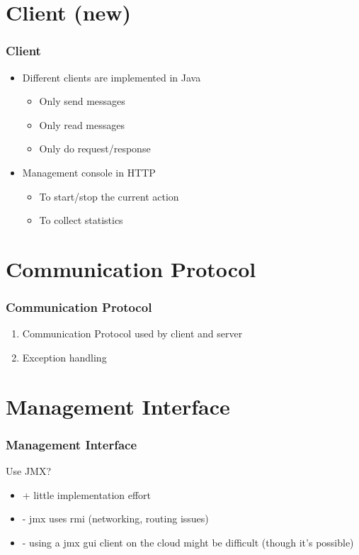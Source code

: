 \documentclass{beamer}
\begin{document}
\section{Client (new)}
\begin{frame}
\frametitle{Client}
\begin{itemize}
\item Different clients are implemented in Java
\begin{itemize}
\item{Only send messages}
\item{Only read messages}
\item{Only do request/response}
\end{itemize}
\item Management console in HTTP
\begin{itemize}
\item{To start/stop the current action}
\item{To collect statistics}
\end{itemize}
\end{itemize}
\end{frame}


\section{Communication Protocol}
\begin{frame}
\frametitle{Communication Protocol}
\begin{enumerate}

\item Communication Protocol used by client and server
\item Exception handling

\end{enumerate}

\end{frame}



\section{Management Interface}
\begin{frame}
\frametitle{Management Interface}
Use JMX?

\begin{itemize}

\item + little implementation effort
\item - jmx uses rmi (networking, routing issues)
\item - using a jmx gui client on the cloud might be difficult (though it's possible)

\end{itemize}
\end{frame}
\end{document}
